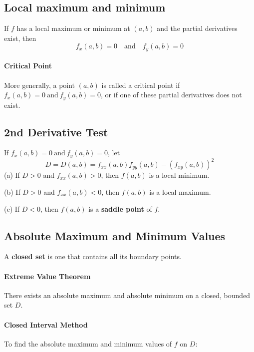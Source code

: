 \documentclass{report}  %
\begin{document}
\subsection*{Local maximum and minimum}
If $f$ has a local maximum or minimum at $(a, b)$ and the partial derivatives exist, then 
\begin{equation}
	f_x (a, b) = 0 \quad \text{and} \quad f_y (a, b) = 0
\end{equation} 

\paragraph{Critical Point} 
More generally, a point $(a, b)$ is called a critical point if $f_x (a, b) = 0 \  \text{and} \  f_y (a, b) = 0$, 
or if one of these partial derivatives does not exist. 

\subsection*{2nd Derivative Test}
If $f_x (a, b) = 0 \  \text{and} \  f_y (a, b) = 0$, let 
\begin{equation}
	D = D(a, b) = f_{xx}(a, b) f_{yy}(a, b) - (f_{xy}(a,b))^2
\end{equation}
(a) If $D > 0$ and $f_{xx}(a, b) > 0$, then $f(a, b)$ is a local minimum.

(b) If $D > 0$ and $f_{xx}(a, b) < 0$, then $f(a, b)$ is a local maximum.

(c) If $D < 0$, then $f(a, b)$ is a \textbf{saddle point} of $f$.

\subsection*{Absolute Maximum and Minimum Values}
A \textbf{closed set} is one that contains all its boundary points. 

\paragraph{Extreme Value Theorem} 
There exists an absolute maximum and absolute minimum on a closed, bounded set $D$. 

\paragraph{Closed Interval Method}
To find the absolute maximum and minimum values of $f$ on $D$: \\
\end{document}
